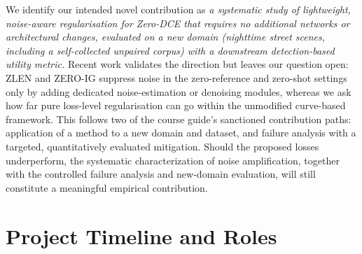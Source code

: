 \documentclass[11pt, letterpaper]{article}
\begin{document}
We identify our intended novel contribution as \textit{a systematic study of lightweight, noise-aware regularisation for Zero-DCE that requires no additional networks or architectural changes, evaluated on a new domain (nighttime street scenes, including a self-collected unpaired corpus) with a downstream detection-based utility metric.} Recent work validates the direction but leaves our question open: ZLEN and ZERO-IG suppress noise in the zero-reference and zero-shot settings only by adding dedicated noise-estimation or denoising modules, whereas we ask how far pure loss-level regularisation can go within the unmodified curve-based framework. This follows two of the course guide's sanctioned contribution paths: application of a method to a new domain and dataset, and failure analysis with a targeted, quantitatively evaluated mitigation. Should the proposed losses underperform, the systematic characterization of noise amplification, together with the controlled failure analysis and new-domain evaluation, will still constitute a meaningful empirical contribution.

\section{Project Timeline and Roles}
\end{document}
